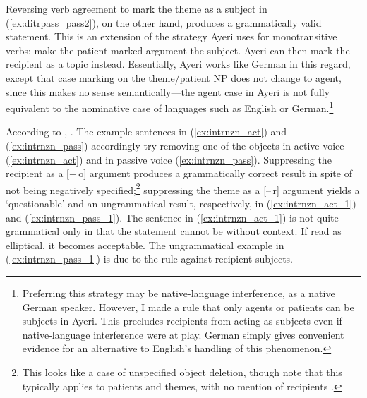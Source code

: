 Reversing verb agreement to mark the theme as a subject in
(\ref{ex:ditrpass_pass2}), on the other hand, produces a grammatically valid
statement. This is an extension of the strategy Ayeri uses for monotransitive
verbs: make the patient-marked argument the subject. Ayeri can then mark the
recipient as a topic instead. Essentially, Ayeri works like German in this
regard, except that case marking on the theme/patient NP does not change to
agent, since this makes no sense semantically---the agent case in Ayeri is not
fully equivalent to the nominative case of languages such as English or
German.\footnote{Preferring this strategy may be
native-language interference, as a native German speaker. However, I made a
rule that only agents or patients can be
subjects in Ayeri. This precludes recipients from acting as subjects even if
native-language interference were at play. German simply gives convenient
evidence for an alternative to English's handling of this phenomenon.}

According to \citet{bresnan2016}, . The example sentences in
(\ref{ex:intrnzn_act}) and (\ref{ex:intrnzn_pass}) accordingly try removing one
of the objects in active voice (\ref{ex:intrnzn_act}) and in
passive voice (\ref{ex:intrnzn_pass}). Suppressing the
recipient as a [+\,o] argument produces a
grammatically correct result in spite of not being negatively
specified;\footnote{This looks like a case of unspecified object deletion,
though \citet{bresnan2016} note that this typically applies to patients
and themes, with no mention of recipients \citep[333]{bresnan2016}.}
suppressing the theme as a \mbox{[–\,r]} argument yields a `questionable' and an
ungrammatical result, respectively, in (\ref{ex:intrnzn_act_1}) and
(\ref{ex:intrnzn_pass_1}). The sentence in (\ref{ex:intrnzn_act_1}) is not quite
grammatical only in that the statement cannot be without context. If read as
elliptical, it becomes acceptable. The ungrammatical example in
(\ref{ex:intrnzn_pass_1}) is due to the rule against recipient subjects.

